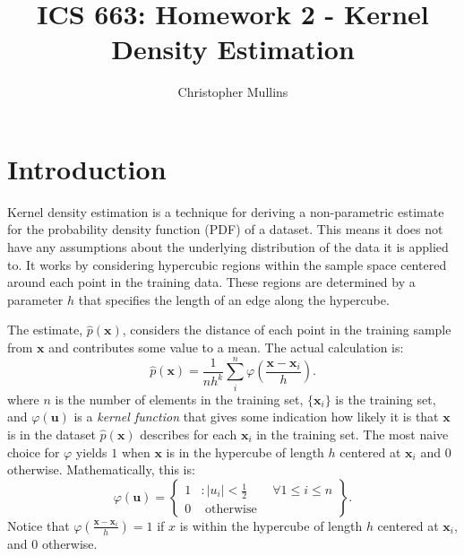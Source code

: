 \documentclass{article}
\begin{document}
\title{ICS 663: Homework 2 - Kernel Density Estimation}
\author{Christopher Mullins}
\maketitle

\noindent\hrulefill
\vspace{-5mm} %
\tableofcontents
\noindent\hrulefill

\section{Introduction}

Kernel density estimation is a technique for deriving a non-parametric estimate
for the probability density function (PDF) of a dataset. This means it does not
have any assumptions about the underlying distribution of the data it is applied
to.  It works by considering hypercubic regions within the sample space centered
around each point in the training data. These regions are determined by a
parameter $h$ that specifies the length of an edge along the hypercube.

The estimate, $\hat{p}(\mathbf{x})$, considers the distance of each point in the
training sample from $\mathbf{x}$ and contributes some value to a mean. The
actual calculation is:
\[
	\hat{p}(\mathbf{x}) = \frac{1}{nh^k} \sum_{i}^{n}
\varphi\left(\frac{\mathbf{x}-\mathbf{x}_i}{h}\right). \]
where $n$ is the number of elements in the training set, $\{ \mathbf{x}_i \}$ is
the training set, and $\varphi(\mathbf{u})$ is a {\it kernel function} that
gives some indication how likely it is that $\mathbf{x}$ is in the dataset
$\hat{p}(\mathbf{x})$ describes for each $\mathbf{x}_i$ in the training set. The
most naive choice for $\varphi$ yields $1$ when $\mathbf{x}$ is in the hypercube
of length $h$ centered at $\mathbf{x}_i$ and $0$ otherwise. Mathematically, this
is:
\[
	\varphi(\mathbf{u}) = \left\{
		\begin{array}{lr}
			1 & : \left| u_i \right| < \frac{1}{2} \qquad \forall 1 \leq i \leq n \\
			0 & \mbox{ otherwise }
		\end{array}
	\right\}.
\]
Notice that $\varphi\left(\frac{\mathbf{x}-\mathbf{x}_i}{h}\right)=1$ if $x$ is
within the hypercube of length $h$ centered at $\mathbf{x}_i$, and $0$
otherwise.
\end{document}
